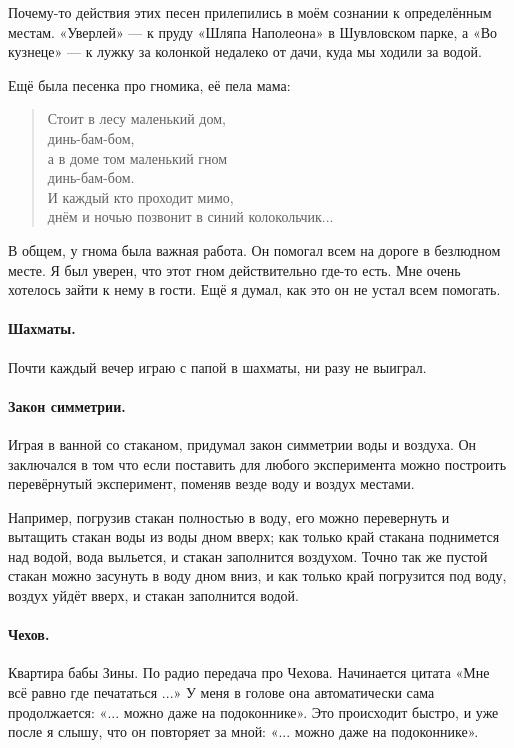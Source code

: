\documentclass{book}
\begin{document}
Почему-то действия этих песен прилепились в моём сознании к определённым местам.
«Уверлей» --- к пруду «Шляпа Наполеона» в Шувловском парке, 
а «Во кузнеце» --- к лужку за колонкой недалеко от дачи, куда мы ходили за водой.

Ещё была песенка про гномика, её пела мама:
\begin{verse}
Стоит в лесу маленький дом, \\
\quad динь-бам-бом,\\
а в доме том маленький гном \\
\quad динь-бам-бом.\\
И каждый кто проходит мимо,\\
\quad днём и ночью позвонит в синий колокольчик...
\end{verse}
В общем, у гнома была важная работа. 
Он помогал всем на дороге в безлюдном месте.
Я был уверен, что этот гном действительно где-то есть.
Мне очень хотелось зайти к нему в гости.
Ещё я думал, как это он не устал всем помогать.

\paragraph{Шахматы.}
Почти каждый вечер играю с папой в шахматы, ни разу не выиграл.

\paragraph{Закон симметрии.}
Играя в ванной со стаканом, придумал закон симметрии воды и воздуха.
Он заключался в том что если поставить для любого эксперимента можно построить перевёрнутый эксперимент, поменяв везде воду и воздух местами.

Например, погрузив стакан полностью в воду, его можно перевернуть и вытащить стакан воды из воды дном вверх; как только край стакана поднимется над водой, вода выльется, и стакан заполнится воздухом.
Точно так же пустой стакан можно засунуть в воду дном вниз, и как только край погрузится под воду, воздух уйдёт вверх, и стакан заполнится водой.

\paragraph{Чехов.}
Квартира бабы Зины.
По радио передача про Чехова.
Начинается цитата «Мне всё равно где печататься ...»
У меня в голове она автоматически сама продолжается: «... можно даже на подоконнике». 
Это происходит быстро, и уже после я слышу, что он повторяет за мной: «... можно даже на подоконнике».
\end{document}
